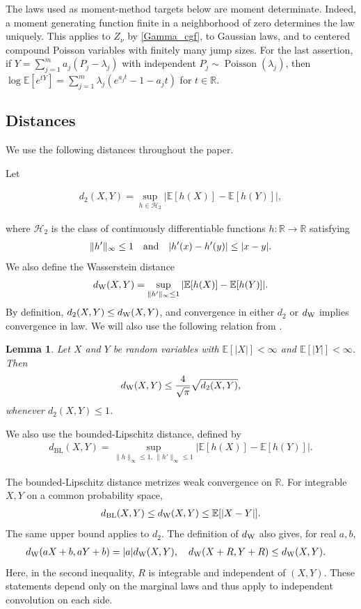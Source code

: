 \documentclass[letterpaper,11pt,reqno]{amsart}
\numberwithin{equation}{section}
\theoremstyle{plain}
\newtheorem{lemma}[theorem]{Lemma}
\theoremstyle{definition}
\theoremstyle{remark}
\newcommand{\E}{\mathbb{E}}
\newcommand{\R}{\mathbb{R}}
\newcommand{\cH}{\mathcal{H}}
\DeclareMathOperator{\Pois}{Poisson}
\newcommand{\noi}{\noindent}
\newcommand{\dW}{d_{\rm W}}
\newcommand{\AND}{\quad{\rm and}\quad}
\begin{document}
The laws used as moment-method targets below are moment
determinate.  Indeed, a moment generating function finite in
a neighborhood of zero determines the law uniquely.  This
applies to $Z_\nu$ by \eqref{Gamma_cgf}, to Gaussian laws, and
to centered compound Poisson variables with finitely many jump
sizes.  For the last assertion, if
$Y=\sum_{j=1}^m a_j(P_j-\lambda_j)$ with independent
$P_j\sim\Pois(\lambda_j)$, then
$\log\E[e^{tY}]
 =\sum_{j=1}^m\lambda_j
 (e^{a_jt}-1-a_jt)$
 for $t\in\R$.


\subsection{Distances}
\label{SEC_dist}
We use the following distances throughout the paper.

Let

\noi
\begin{align}\label{d2d}
 d_2(X,Y)
 =\sup_{h\in\cH_2}
 |\E[h(X)]-\E[h(Y)]|,
\end{align}

\noi
where $\cH_2$ is the class of continuously differentiable functions
$h:\R\to\R$ satisfying
\noi
\begin{align*}
 \|h'\|_\infty\leq1
 \AND
 |h'(x)-h'(y)|\leq|x-y|.
\end{align*}
We also define the Wasserstein distance
\begin{align}\label{def_dW}
 \dW(X,Y)
 =\sup_{\|h'\|_\infty\leq1}
 |\E[h(X)]-\E[h(Y)]|.
\end{align}
By definition, $d_2(X,Y)\leq\dW(X,Y)$, and convergence in either
$d_2$ or $\dW$ implies convergence in law.
We will also use the following relation from
\cite[Lemma~1.4]{DP18a}.
\begin{lemma}\label{lem_d2_dW}
Let $X$ and $Y$ be random variables with
$\E[|X|]<\infty$ and $\E[|Y|]<\infty$.  Then
\begin{align}\label{dW_d2}
\dW(X,Y) \leq \frac{4}{\sqrt{\pi}}\sqrt{d_2(X,Y)},
\end{align}
whenever $d_2(X,Y)\leq1$.
\end{lemma}

We also use the bounded-Lipschitz distance, defined by
\begin{align*}
 d_{\mathrm{BL}}(X,Y)
 =\sup_{\|h\|_\infty\leq1,\,\|h'\|_\infty\leq1}
 |\E[h(X)]-\E[h(Y)]|.
\end{align*}

The bounded-Lipschitz distance metrizes weak convergence on
$\R$.  For integrable $X,Y$ on a common probability space,
\noi
\begin{align*}
 d_{\mathrm{BL}}(X,Y)
 \leq\dW(X,Y)\leq\E[|X-Y|].
\end{align*}
The same upper bound applies to $d_2$.  The definition of
$\dW$ also gives, for real $a,b$,
\noi
\begin{align}
 \begin{aligned}
 \dW(aX+b,aY+b)&=|a|\dW(X,Y), \quad
 \dW(X+R,Y+R)\leq\dW(X,Y).
 \end{aligned}
 \label{dist_conv}
\end{align}
Here, in the second inequality, $R$ is integrable and independent
of $(X,Y)$.  These statements depend only on the marginal
laws and thus apply to independent convolution on each side.
\end{document}
